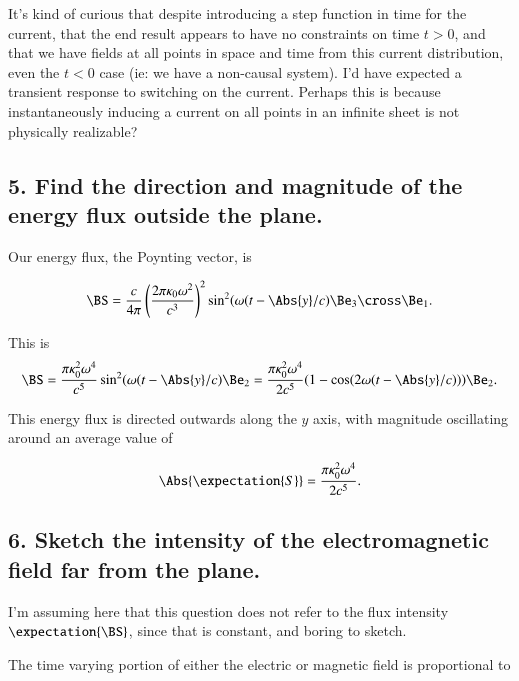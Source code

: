 It's kind of curious that despite introducing a step function in time for the current, that the end result appears to have no constraints on time $t > 0$, and that we have fields at all points in space and time from this current distribution, even the $t < 0$ case (ie: we have a non-causal system).  I'd have expected a transient response to switching on the current.  Perhaps this is because instantaneously inducing a current on all points in an infinite sheet is not physically realizable?

\subsection{5. Find the direction and magnitude of the energy flux outside the plane.}

Our energy flux, the Poynting vector, is

\begin{equation}\label{eqn:relElectroDynProblemSet5P1:220}
\BS 
= \frac{c}{4\pi}
\left( \frac{
2 \pi \kappa_0 \omega^2
}{c^3} \right)^2 \sin^2(\omega(t - \Abs{y}/c) \Be_3 \cross \Be_1.
\end{equation}

This is
\begin{equation}\label{eqn:relElectroDynProblemSet5P1:240}
\BS 
= 
\frac{ \pi \kappa_0^2 \omega^4 }{c^5} \sin^2(\omega(t - \Abs{y}/c) \Be_2
= 
\frac{ \pi \kappa_0^2 \omega^4 }{2 c^5} (1 - \cos( 2 \omega(t - \Abs{y}/c) ) ) \Be_2.
\end{equation}

This energy flux is directed outwards along the $y$ axis, with magnitude oscillating around an average value of

\begin{equation}\label{eqn:relElectroDynProblemSet5P1:260}
\Abs{\expectation{S}} = \frac{ \pi \kappa_0^2 \omega^4 }{2 c^5}.
\end{equation}

\subsection{6. Sketch the intensity of the electromagnetic field far from the plane.}

I'm assuming here that this question does not refer to the flux intensity $\expectation{\BS}$, since that is constant, and boring to sketch.

The time varying portion of either the electric or magnetic field is proportional to

